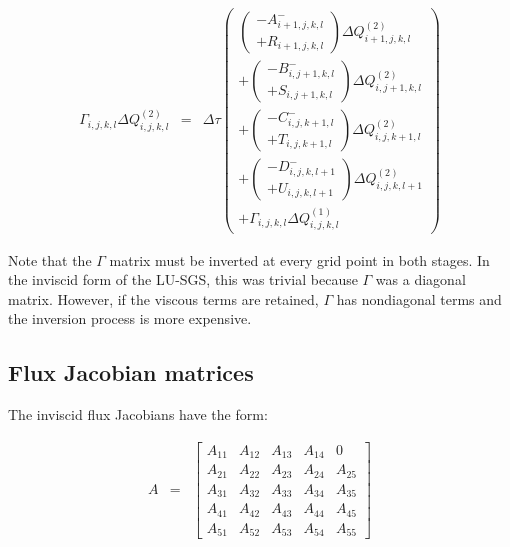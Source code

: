 \begin{eqnarray}
\Gamma_{i,j,k,l} 
\Delta Q_{i,j,k,l}^{\left(2 \right)}
&=&
\Delta \tau
\left(
\begin{array}{r}
  \left(
\begin{array}{r}
-A^-_{i+1,j,k,l} 
\\
+ R_{i+1,j,k,l} 
\end{array}
\right) \Delta Q_{i+1,j,k,l}^{\left(2 \right)}
\\
+ \left(
\begin{array}{r}
-B^-_{i,j+1,k,l} 
\\
+ S_{i,j+1,k,l} 
\end{array}
\right) \Delta Q_{i,j+1,k,l}^{\left(2 \right)}
\\
+ \left(
\begin{array}{r}
-C^-_{i,j,k+1,l} 
\\
+ T_{i,j,k+1,l} 
\end{array}
\right) \Delta Q_{i,j,k+1,l}^{\left(2 \right)}
\\
+ \left(
\begin{array}{r}
-D^-_{i,j,k,l+1} 
\\
+ U_{i,j,k,l+1} 
\end{array}
\right) \Delta Q_{i,j,k,l+1}^{\left(2 \right)}
\\
+
\Gamma_{i,j,k,l} 
\Delta Q_{i,j,k,l}^{\left(1 \right)}
\end{array}
\right)
\nonumber
\end{eqnarray}

Note that the $\Gamma$ matrix must be inverted at every grid point
in both stages.  In the inviscid form of the LU-SGS, this was
trivial because $\Gamma$ was a diagonal matrix.  However, if the
viscous terms are retained, $\Gamma$ has nondiagonal terms and
the inversion process is more expensive.

\subsection{Flux Jacobian matrices}

The inviscid flux Jacobians have the form:

\begin{eqnarray}
A
&=&
\left[
\begin{array}{ccccc}
A_{11} & A_{12} & A_{13} & A_{14} & 0 \\
A_{21} & A_{22} & A_{23} & A_{24} & A_{25} \\
A_{31} & A_{32} & A_{33} & A_{34} & A_{35} \\
A_{41} & A_{42} & A_{43} & A_{44} & A_{45} \\
A_{51} & A_{52} & A_{53} & A_{54} & A_{55}
\end{array}
\right]
\nonumber
\end{eqnarray}

